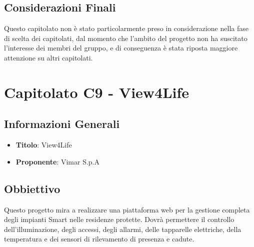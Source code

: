 \documentclass[a4paper,12pt]{article}
\begin{document}
    \subsection{Considerazioni Finali}
    Questo capitolato non è stato particolarmente preso in considerazione nella fase di scelta dei capitolati, dal momento che l’ambito del progetto non ha suscitato l’interesse dei membri del gruppo, e di conseguenza è stata riposta maggiore attenzione su altri capitolati.


    \section{Capitolato C9 - View4Life}
    \subsection{Informazioni Generali}
        \begin{itemize}
            \item \textbf{Titolo}: View4Life
            \item \textbf{Proponente}: Vimar S.p.A
        \end{itemize}
    \subsection{Obbiettivo}
    Questo progetto mira a realizzare una piattaforma web per la gestione completa degli impianti Smart nelle residenze protette. Dovrà permettere il controllo dell’illuminazione, degli accessi, degli allarmi, delle tapparelle elettriche, della temperatura e dei sensori di rilevamento di presenza e cadute.
\end{document}
